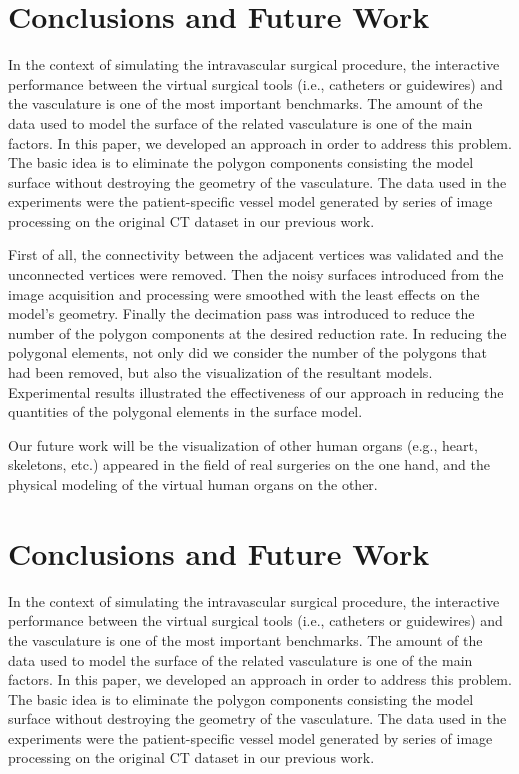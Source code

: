 
\section{Conclusions and Future Work}

In the context of simulating the intravascular surgical procedure, the interactive performance between the virtual surgical tools (i.e., catheters or guidewires) and the vasculature is one of the most important benchmarks. %
The amount of the data used to model the surface of the related vasculature is one of the main factors.
In this paper, we developed an approach in order to address this problem.
The basic idea is to eliminate the polygon components consisting the model surface without destroying the geometry of the vasculature.
The data used in the experiments were the patient-specific vessel model generated by series of image processing on the original CT dataset in our previous work.

First of all, the connectivity between the adjacent vertices was validated and the unconnected vertices were removed.
Then the noisy surfaces introduced from the image acquisition and processing were smoothed with the least effects on the model's geometry.
Finally the decimation pass was introduced to reduce the number of the polygon components at the desired reduction rate.
In reducing the polygonal elements, not only did we consider the number of the polygons that had been removed, but also the visualization of the resultant models.
Experimental results illustrated the effectiveness of our approach in reducing the quantities of the polygonal elements in the surface model.

Our future work will be the visualization of other human organs (e.g., heart, skeletons, etc.) appeared in the field of real surgeries on the one hand, and the physical modeling of the virtual human organs on the other. %
\section{Conclusions and Future Work}
\label{sec6_3}

In the context of simulating the intravascular surgical procedure, the interactive performance between the virtual surgical tools (i.e., catheters or guidewires) and the vasculature is one of the most important benchmarks. %
The amount of the data used to model the surface of the related vasculature is one of the main factors.
In this paper, we developed an approach in order to address this problem.
The basic idea is to eliminate the polygon components consisting the model surface without destroying the geometry of the vasculature.
The data used in the experiments were the patient-specific vessel model generated by series of image processing on the original CT dataset in our previous work.

